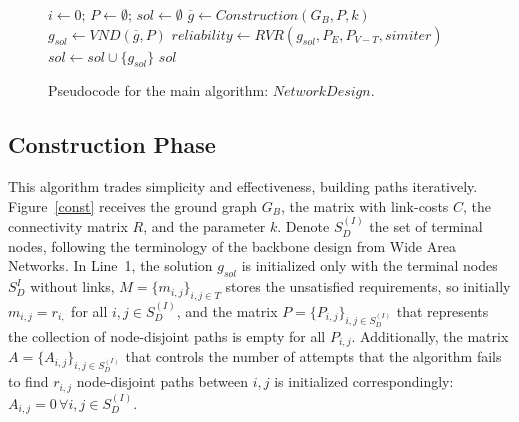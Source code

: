 \documentclass{llncs}
\begin{document}
\begin{figure}[H]
\begin{algorithm}[H]
\caption{$sol = NetworkDesign(G_B,iter,k,p_{min},P_E,P_{V-T},simiter)$}
\begin{algorithmic}[1]
\STATE $i \leftarrow 0; \, P \leftarrow \emptyset; \, sol \leftarrow \emptyset$
\STATE $\overline{g} \leftarrow Construction(G_B,P,k)$
\STATE $g_{sol} \leftarrow VND(\overline{g},P)$
\STATE $reliability \leftarrow RVR(g_{sol},P_E,P_{V-T},simiter)$
\STATE $sol \leftarrow sol \cup \{g_{sol}\}$
\ENDIF
\ENDWHILE
\RETURN $sol$
\end{algorithmic}
\end{algorithm}
\caption{Pseudocode for the main algorithm: $NetworkDesign$.\label{MainAlgorithm}}
\end{figure}

\subsection{Construction Phase}
This algorithm trades simplicity and effectiveness, building paths iteratively. 
Figure~\ref{const} receives the ground graph $G_B$, the matrix with link-costs $C$, 
the connectivity matrix $R$, and the parameter $k$. 
Denote $S_{D}^{(I)}$ the set of terminal nodes, following the terminology of the backbone design from Wide Area Networks. 
In Line~1, the solution $g_{sol}$ is initialized only with the terminal nodes $S_{D}^{I}$ 
without links, $M=\{m_{i,j}\}_{i,j\in T}$ stores the unsatisfied requirements, 
so initially $m_{i,j}=r_{i,}$ for all $i,j\in S_{D}^{(I)}$, and 
the matrix $P=\{P_{i,j}\}_{i,j\in S_{D}^{(I)}}$ that represents the collection of node-disjoint paths is empty for all $P_{i,j}$. Additionally, the matrix $A=\{A_{i,j}\}_{i,j\in S_{D}^{(I)}}$  that controls 
the number of attempts that the algorithm fails to find $r_{i,j}$ node-disjoint paths 
between $i,j$ is initialized correspondingly: $A_{i,j}=0\, \forall i, j \in S_{D}^{(I)}$. 
\end{document}
